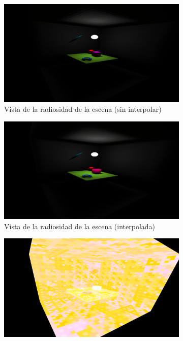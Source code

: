 \begin{figure}[H]
	\centering
		\begin{subfigure}{0.4\textwidth}
		\includegraphics[width=1\linewidth]{assets/display-view(3)}
		\caption{Vista de la radiosidad de la escena (sin interpolar)}
	\end{subfigure}
	\begin{subfigure}{0.4\textwidth}
		\includegraphics[width=1\linewidth]{assets/display-view(4)}
		\caption{Vista de la radiosidad de la escena (interpolada)}
	\end{subfigure}
	\begin{subfigure}{0.4\textwidth}
		\includegraphics[width=1\linewidth]{assets/display-view(1)}

\end{subfigure}
\end{figure}
